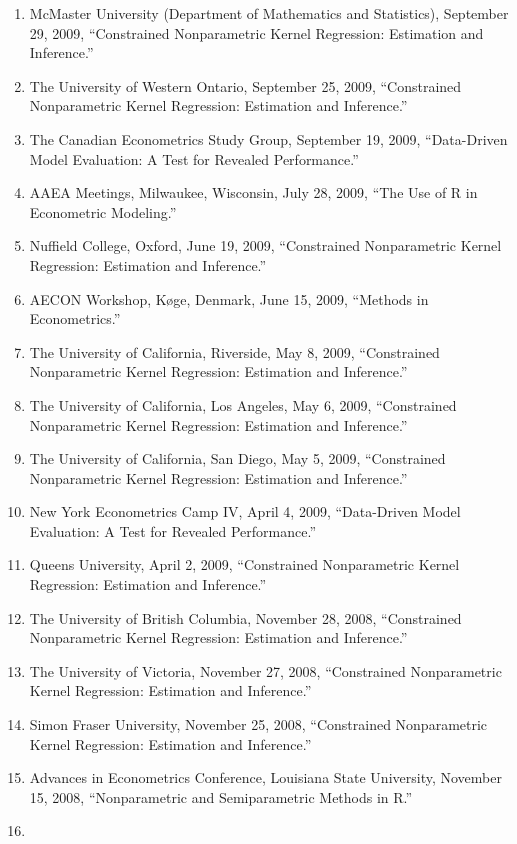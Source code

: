 \documentclass[
]{article}
\begin{document}
\begin{enumerate}
  Frontier Analysis.''
\item
  McMaster University (Department of Mathematics and Statistics),
  September 29, 2009, ``Constrained Nonparametric Kernel Regression:
  Estimation and Inference.''
\item
  The University of Western Ontario, September 25, 2009, ``Constrained
  Nonparametric Kernel Regression: Estimation and Inference.''
\item
  The Canadian Econometrics Study Group, September 19, 2009,
  ``Data-Driven Model Evaluation: A Test for Revealed Performance.''
\item
  AAEA Meetings, Milwaukee, Wisconsin, July 28, 2009, ``The Use of R in
  Econometric Modeling.''
\item
  Nuffield College, Oxford, June 19, 2009, ``Constrained Nonparametric
  Kernel Regression: Estimation and Inference.''
\item
  AECON Workshop, Køge, Denmark, June 15, 2009, ``Methods in
  Econometrics.''
\item
  The University of California, Riverside, May 8, 2009, ``Constrained
  Nonparametric Kernel Regression: Estimation and Inference.''
\item
  The University of California, Los Angeles, May 6, 2009, ``Constrained
  Nonparametric Kernel Regression: Estimation and Inference.''
\item
  The University of California, San Diego, May 5, 2009, ``Constrained
  Nonparametric Kernel Regression: Estimation and Inference.''
\item
  New York Econometrics Camp IV, April 4, 2009, ``Data-Driven Model
  Evaluation: A Test for Revealed Performance.''
\item
  Queens University, April 2, 2009, ``Constrained Nonparametric Kernel
  Regression: Estimation and Inference.''
\item
  The University of British Columbia, November 28, 2008, ``Constrained
  Nonparametric Kernel Regression: Estimation and Inference.''
\item
  The University of Victoria, November 27, 2008, ``Constrained
  Nonparametric Kernel Regression: Estimation and Inference.''
\item
  Simon Fraser University, November 25, 2008, ``Constrained
  Nonparametric Kernel Regression: Estimation and Inference.''
\item
  Advances in Econometrics Conference, Louisiana State University,
  November 15, 2008, ``Nonparametric and Semiparametric Methods in R.''
\item

\end{enumerate}
\end{document}
